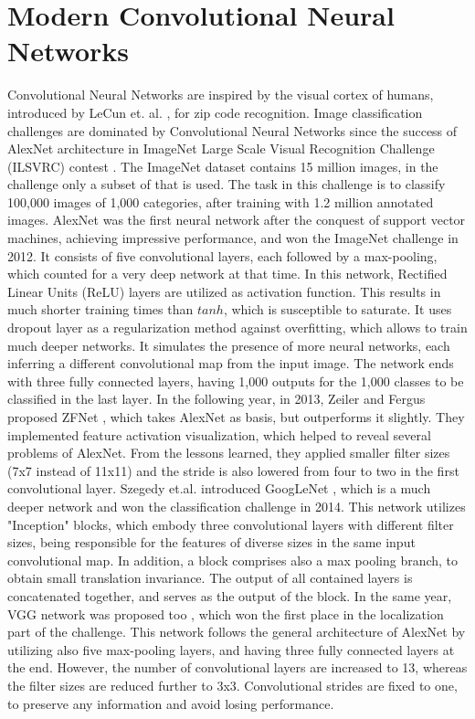 \section{Modern Convolutional Neural Networks}\label{s:convnets}
Convolutional Neural Networks are inspired by the visual cortex of humans,  introduced by LeCun et. al. \cite{LeCun:1989:BAH:1351079.1351090}, for zip code recognition. Image classification challenges are dominated by Convolutional Neural Networks since the success of AlexNet architecture \cite{NIPS2012_4824} in ImageNet Large Scale Visual Recognition Challenge (ILSVRC) contest \cite{ILSVRC15}. The ImageNet dataset contains 15 million images, in the challenge only a subset of that is used. The task in this challenge is to classify 100,000 images of 1,000 categories, after training with 1.2 million annotated images.
\bigbreak
AlexNet was the first neural network after the conquest of support vector machines, achieving impressive performance, and won the ImageNet challenge in 2012. It consists of five convolutional layers, each followed by a max-pooling, which counted for a very deep network at that time. In this network, Rectified Linear Units (ReLU) layers are utilized as activation function. This results in much shorter training times than $\mathit{tanh}$, which is susceptible to saturate. It uses dropout layer \cite{journals/corr/abs-1207-0580} as a regularization method against overfitting, which allows to train much deeper networks. It simulates the presence of more neural networks, each inferring a different convolutional map from the input image. The network ends with three fully connected layers, having 1,000 outputs for the 1,000 classes to be classified in the last layer.
\bigbreak
In the following year, in 2013, Zeiler and Fergus proposed ZFNet \cite{DBLP:journals/corr/ZeilerF13}, which takes AlexNet as basis, but outperforms it slightly. They implemented feature activation visualization, which helped to reveal several problems of AlexNet. From the lessons learned, they applied smaller filter sizes (7x7 instead of 11x11) and the stride is also lowered from four to two in the first convolutional layer. 
\bigbreak
Szegedy et.al. introduced GoogLeNet \cite{DBLP:journals/corr/SzegedyLJSRAEVR14}, which is a much deeper network and won the classification challenge in 2014. This network utilizes "Inception" blocks, which embody three convolutional layers with different filter sizes, being responsible for the features of diverse sizes in the same input convolutional map. In addition, a block comprises also a max pooling branch, to obtain small translation invariance. The output of all contained layers is concatenated together, and serves as the output of the block. In the same year, VGG network was proposed too \cite{Simonyan14c}, which won the first place in the localization part of the challenge. This network follows the general architecture of AlexNet by utilizing also five max-pooling layers, and having three fully connected layers at the end. However, the number of convolutional layers are increased to 13, whereas the filter sizes are reduced further to 3x3. Convolutional strides are fixed to one, to preserve any information and avoid losing performance.
